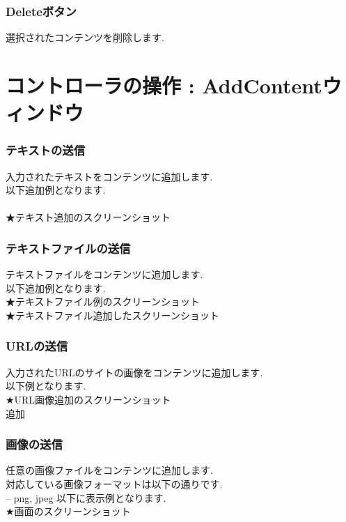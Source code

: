 \documentclass[a4paper,10pt,oneside]{jsbook}
\begin{document}
\subsection{Deleteボタン}
選択されたコンテンツを削除します.\\

\chapter{コントローラの操作 : AddContentウィンドウ}
\subsection{テキストの送信}
入力されたテキストをコンテンツに追加します.\\
以下追加例となります.\\
\\

★テキスト追加のスクリーンショット\\


\subsection{テキストファイルの送信}
テキストファイルをコンテンツに追加します.\\
以下追加例となります.\\

★テキストファイル例のスクリーンショット\\
★テキストファイル追加したスクリーンショット\\


\subsection{URLの送信}
入力されたURLのサイトの画像をコンテンツに追加します.\\
以下例となります.\\
★URL画像追加のスクリーンショット\\追加



\subsection{画像の送信}
任意の画像ファイルをコンテンツに追加します.\\
対応している画像フォーマットは以下の通りです.\\
-- png, jpeg
以下に表示例となります.\\
★画面のスクリーンショット\\
\end{document}
